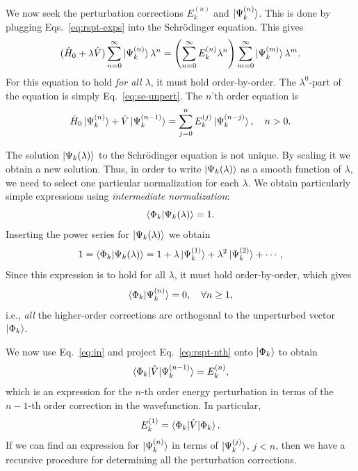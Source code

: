 \documentclass{report}
\theoremstyle{plain}
\theoremstyle{definition}
\begin{document}
We now seek the perturbation corrections $E_k^{(n)}$ and
$\ket{\Psi_k^{(n)}}$. This is done by plugging
Eqs.~\eqref{eq:rspt-exps} into the Schr\"odinger equation. This gives
\begin{equation}
  (\hat{H}_0 + \lambda \hat{V}) \sum_{n=0}^\infty
  \ket{\Psi_k^{(n)}}\lambda^n = \left(\sum_{n=0}^\infty
    E_k^{(n)}\lambda^n\right) \sum_{m=0}^\infty \ket{\Psi_k^{(m)}}\lambda^m.
\end{equation}
For this equation to hold \emph{for all $\lambda$}, it must hold
order-by-order. The $\lambda^0$-part of the equation is simply
Eq.~\eqref{eq:se-unpert}. The $n$'th order equation is
\begin{equation}
  \hat{H}_0 \ket{\Psi_k^{(n)}} + \hat{V} \ket{\Psi_k^{(n-1)}} =
  \sum_{j=0}^n E_k^{(j)} \ket{\Psi_k^{(n-j)}}, \quad n > 0. \label{eq:rspt-nth}
\end{equation}

The solution $\ket{\Psi_k(\lambda)}$ to the Schr\"odinger equation is not
unique. By scaling it we obtain a new solution. Thus, in order to
write $\ket{\Psi_k(\lambda)}$ as a smooth function of $\lambda$, we need to select one
particular normalization for each $\lambda$. We obtain particularly simple expressions
using \emph{intermediate normalization}:
\begin{equation}
  \braket{\Phi_k|\Psi_k(\lambda)} = 1.
\end{equation}
Inserting the power series for $\ket{\Psi_k(\lambda)}$ we obtain
\begin{equation}
  1 =   \braket{\Phi_k|\Psi_k(\lambda)} = 1 + \lambda \ket{\Psi_k^{(1)}}
   + \lambda^2 \ket{\Psi_k^{(2)}} + \cdots,
\end{equation}
Since this expression is to hold for all $\lambda$, it must hold
order-by-order, which gives
\begin{equation}
  \braket{\Phi_k|\Psi_k^{(n)}} = 0, \quad \forall n\geq 1, \label{eq:in}
\end{equation}
i.e., \emph{all} the higher-order corrections are orthogonal to the
unperturbed vector $\ket{\Phi_k}$.

We now use Eq.~\eqref{eq:in} and project Eq.~\eqref{eq:rspt-nth} onto
$\ket{\Phi_k}$ to obtain
\begin{equation}
  \braket{\Phi_k|\hat{V}|\Psi_k^{(n-1)}} = E_k^{(n)},
\end{equation}
which is an expression for the $n$-th order energy perturbation in
terms of the $n-1$-th order correction in the wavefunction. In
particular,
\begin{equation}
  E_k^{(1)} = \braket{\Phi_k|\hat{V}|\Phi_k}.
\end{equation}
If we can find an expression for $\ket{\Psi_k^{(n)}}$ in terms of
$\ket{\Psi_k^{(j)}}$, $j < n$, then we have a recursive procedure for
determining all the perturbation corrections.
\end{document}
